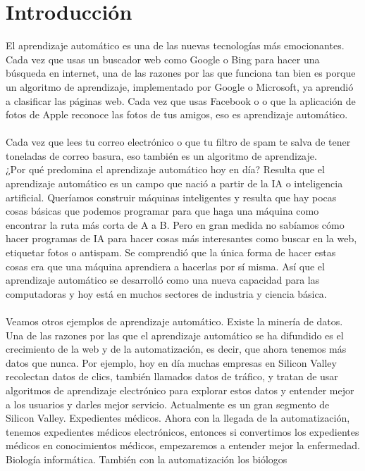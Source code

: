 \documentclass{report}
\begin{document}
\chapter{Introducción}
El aprendizaje automático es una
de las nuevas tecnologías más emocionantes. Cada vez que usas un buscador web como Google o Bing para hacer una
búsqueda en internet, una de las razones por las que funciona tan bien es porque
un algoritmo de aprendizaje, implementado por Google o Microsoft, ya aprendió a clasificar las
páginas web. Cada vez que usas Facebook o o que la aplicación de fotos de Apple
reconoce las fotos de tus amigos, eso es aprendizaje automático. \\\\Cada vez que lees
tu correo electrónico o que tu filtro de spam te salva de tener toneladas de correo basura,
eso también es un algoritmo de aprendizaje.\\¿Por qué
predomina el aprendizaje automático hoy en día? Resulta que el aprendizaje automático es un
campo que nació a partir de la IA o inteligencia artificial. Queríamos
construir máquinas inteligentes y resulta que hay pocas cosas básicas que
podemos programar para que haga una máquina como encontrar la ruta más corta de A a B.
Pero en gran medida no sabíamos cómo hacer programas de IA para hacer cosas
más interesantes como buscar en la web, etiquetar fotos o antispam. Se comprendió
que la única forma de hacer estas cosas era que una máquina aprendiera
a hacerlas por sí misma. Así que el aprendizaje automático se desarrolló como una nueva capacidad
para las computadoras y hoy está en muchos sectores de industria y ciencia básica.\\\\Veamos otros ejemplos de aprendizaje automático. Existe la minería de datos.
Una de las razones por las que el aprendizaje automático se ha difundido es el crecimiento de la web y
de la automatización, es decir, que ahora tenemos más datos que
nunca. Por ejemplo, hoy en día muchas empresas en Silicon Valley recolectan datos de
clics, también llamados datos de tráfico, y tratan de usar algoritmos de aprendizaje
electrónico para explorar estos datos y entender mejor a los usuarios y darles
mejor servicio. Actualmente es un gran segmento de Silicon Valley. Expedientes
médicos. Ahora con la llegada de la automatización, tenemos expedientes médicos electrónicos, entonces si
convertimos los expedientes médicos en conocimientos médicos, empezaremos a entender mejor
la enfermedad. Biología informática. También con la automatización los biólogos
\end{document}
